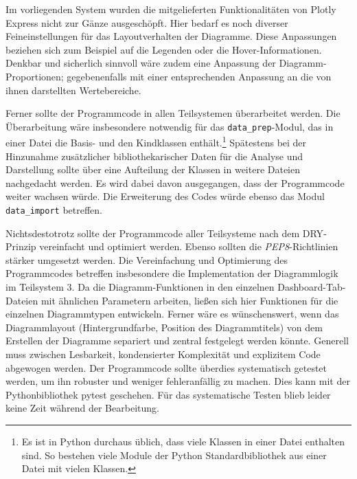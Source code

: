 Im vorliegenden System wurden die mitgelieferten Funktionalitäten von Plotly Express nicht zur Gänze ausgeschöpft. Hier bedarf es noch diverser Feineinstellungen für das Layoutverhalten der Diagramme.
Diese Anpassungen beziehen sich zum Beispiel auf die Legenden oder die Hover-Informationen.
Denkbar und sicherlich sinnvoll wäre zudem eine Anpassung der Diagramm-Proportionen; gegebenenfalls mit einer entsprechenden Anpassung an die von ihnen darstellten Wertebereiche. 


Ferner sollte der Programmcode in allen Teilsystemen überarbeitet werden. Die Überarbeitung wäre insbesondere notwendig für das \texttt{data\_prep}-Modul, 
das in einer Datei die Basis- und den Kindklassen enthält.\footnote{Es ist in Python durchaus üblich, dass viele Klassen in einer Datei enthalten sind. 
So bestehen viele Module der Python Standardbibliothek aus einer Datei mit vielen Klassen.}
Spätestens bei der Hinzunahme zusätzlicher bibliothekarischer Daten für die Analyse und Darstellung sollte über eine Aufteilung der Klassen in weitere Dateien nachgedacht werden. 
Es wird dabei davon ausgegangen, dass der Programmcode weiter wachsen würde. Die Erweiterung des Codes würde ebenso das Modul \texttt{data\_import} betreffen. 

Nichtsdestotrotz sollte der Programmcode aller Teilsysteme nach dem \acrfull{DRY}-Prinzip vereinfacht und optimiert werden.
Ebenso sollten die \textit{\acrshort{PEP8}}-Richtlinien stärker umgesetzt werden.
Die Vereinfachung und Optimierung des Programmcodes betreffen insbesondere die Implementation der Diagrammlogik im Teilsystem 3. Da die Diagramm-Funktionen in den einzelnen Dashboard-Tab-Dateien mit ähnlichen Parametern arbeiten, 
ließen sich hier Funktionen für die einzelnen Diagrammtypen entwickeln. Ferner wäre es wünschenswert, wenn das Diagrammlayout (Hintergrundfarbe, Position des Diagrammtitels) 
von dem Erstellen der Diagramme separiert und zentral festgelegt werden könnte. 
Generell muss zwischen Lesbarkeit, kondensierter Komplexität und explizitem Code abgewogen werden. %
Der Programmcode sollte überdies systematisch getestet werden, um ihn robuster und weniger fehleranfällig zu machen. 
Dies kann mit der Pythonbibliothek pytest geschehen. Für das systematische Testen blieb leider keine Zeit während der Bearbeitung.

